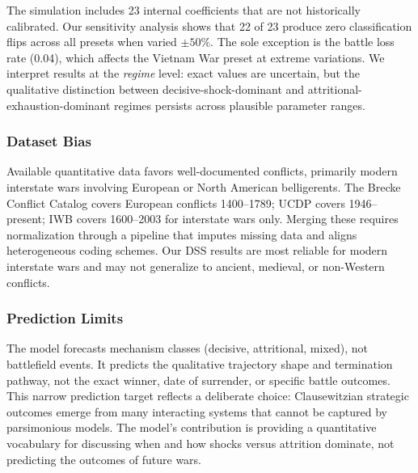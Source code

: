 The simulation includes 23 internal coefficients that are not historically calibrated. Our sensitivity analysis shows that 22 of 23 produce zero classification flips across all presets when varied $\pm 50\%$. The sole exception is the battle loss rate (0.04), which affects the Vietnam War preset at extreme variations. We interpret results at the \emph{regime} level: exact values are uncertain, but the qualitative distinction between decisive-shock-dominant and attritional-exhaustion-dominant regimes persists across plausible parameter ranges.

\subsubsection{Dataset Bias}

Available quantitative data favors well-documented conflicts, primarily modern interstate wars involving European or North American belligerents. The Brecke Conflict Catalog covers European conflicts 1400--1789; UCDP covers 1946--present; IWB covers 1600--2003 for interstate wars only. Merging these requires normalization through a pipeline that imputes missing data and aligns heterogeneous coding schemes. Our DSS results are most reliable for modern interstate wars and may not generalize to ancient, medieval, or non-Western conflicts.

\subsubsection{Prediction Limits}

The model forecasts mechanism classes (decisive, attritional, mixed), not battlefield events. It predicts the qualitative trajectory shape and termination pathway, not the exact winner, date of surrender, or specific battle outcomes. This narrow prediction target reflects a deliberate choice: Clausewitzian strategic outcomes emerge from many interacting systems that cannot be captured by parsimonious models. The model's contribution is providing a quantitative vocabulary for discussing when and how shocks versus attrition dominate, not predicting the outcomes of future wars.
